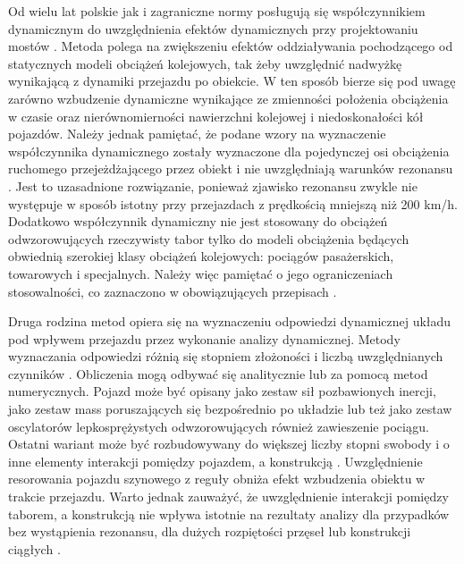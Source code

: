 Od wielu lat polskie jak i zagraniczne normy posługują się współczynnikiem dynamicznym do uwzględnienia efektów dynamicznych przy projektowaniu mostów \parencite{Karas2011}. Metoda polega na zwiększeniu efektów oddziaływania pochodzącego od statycznych modeli obciążeń kolejowych, tak żeby uwzględnić nadwyżkę wynikającą z dynamiki przejazdu po obiekcie. W ten sposób bierze się pod uwagę zarówno wzbudzenie dynamiczne wynikające ze zmienności położenia obciążenia w czasie oraz nierównomierności nawierzchni kolejowej i niedoskonałości kół pojazdów. Należy jednak pamiętać, że podane wzory na wyznaczenie współczynnika dynamicznego zostały wyznaczone dla pojedynczej osi obciążenia ruchomego przejeżdżającego przez obiekt i nie uwzględniają warunków rezonansu \parencite{Goicolea2008}. Jest to uzasadnione rozwiązanie, ponieważ zjawisko rezonansu zwykle nie występuje w sposób istotny przy przejazdach z prędkością mniejszą niż 200 km/h. Dodatkowo współczynnik dynamiczny nie jest stosowany do obciążeń odwzorowujących rzeczywisty tabor tylko do modeli obciążenia będących obwiednią szerokiej klasy obciążeń kolejowych: pociągów pasażerskich, towarowych i specjalnych. Należy więc pamiętać o jego ograniczeniach stosowalności, co zaznaczono w obowiązujących przepisach \parencite{PKNj}. 

Druga rodzina metod opiera się na wyznaczeniu odpowiedzi dynamicznej układu pod wpływem przejazdu przez wykonanie analizy dynamicznej. Metody wyznaczania odpowiedzi różnią się stopniem złożoności i liczbą uwzględnianych czynników \parencite{Goicolea2008a}. Obliczenia mogą odbywać się analitycznie lub za pomocą metod numerycznych. Pojazd może być opisany jako zestaw sił pozbawionych inercji, jako zestaw mass poruszających się bezpośrednio po układzie lub też jako zestaw oscylatorów lepkosprężystych odwzorowujących również zawieszenie pociągu. Ostatni wariant może być rozbudowywany do większej liczby stopni swobody i o inne elementy interakcji pomiędzy pojazdem, a konstrukcją \parencite{Calcada2008,Szafranski2013,Szafranski2021}. Uwzględnienie resorowania pojazdu szynowego z reguły obniża efekt wzbudzenia obiektu w trakcie przejazdu. Warto jednak zauważyć, że uwzględnienie interakcji pomiędzy taborem, a konstrukcją nie wpływa istotnie na rezultaty analizy dla przypadków bez wystąpienia rezonansu, dla dużych rozpiętości przęseł lub konstrukcji ciągłych \parencite{Goicolea2008a}.

